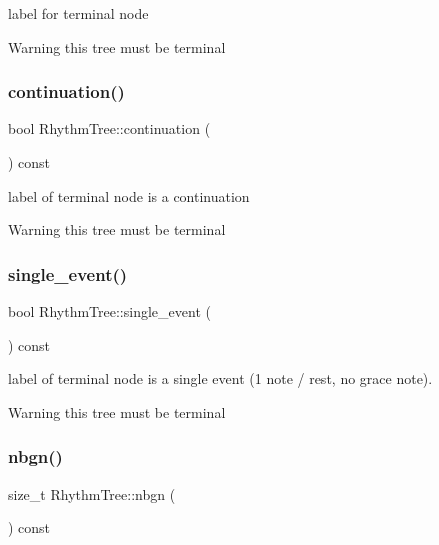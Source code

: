 label for terminal node 

\begin{DoxyWarning}{Warning}
this tree must be terminal 
\end{DoxyWarning}
\mbox{\label{group__output_ga1ca015dec36fa32ff6d66aaad10f4eb0}} 
\subsubsection{\texorpdfstring{continuation()}{continuation()}}
{\footnotesize\ttfamily bool Rhythm\+Tree\+::continuation (\begin{DoxyParamCaption}{ }\end{DoxyParamCaption}) const}



label of terminal node is a continuation 

\begin{DoxyWarning}{Warning}
this tree must be terminal 
\end{DoxyWarning}
\mbox{\label{group__output_gabd793b78f71fb62edb13497e0a13f48c}} 
\subsubsection{\texorpdfstring{single\_event()}{single\_event()}}
{\footnotesize\ttfamily bool Rhythm\+Tree\+::single\+\_\+event (\begin{DoxyParamCaption}{ }\end{DoxyParamCaption}) const}



label of terminal node is a single event (1 note / rest, no grace note). 

\begin{DoxyWarning}{Warning}
this tree must be terminal 
\end{DoxyWarning}
\mbox{\label{group__output_gaaaf06fe2227a6598b109a72d89afa8d7}} 
\subsubsection{\texorpdfstring{nbgn()}{nbgn()}}
{\footnotesize\ttfamily size\+\_\+t Rhythm\+Tree\+::nbgn (\begin{DoxyParamCaption}{ }\end{DoxyParamCaption}) const}



